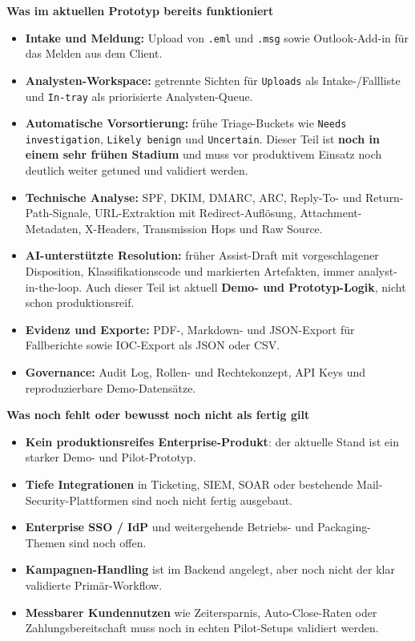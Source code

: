 \documentclass[10pt,a4paper]{article}
\begin{document}
\noindent\textbf{Was im aktuellen Prototyp bereits funktioniert}
\begin{itemize}
  \item \textbf{Intake und Meldung:} Upload von \texttt{.eml} und \texttt{.msg} sowie Outlook-Add-in für das Melden aus dem Client.
  \item \textbf{Analysten-Workspace:} getrennte Sichten für \texttt{Uploads} als Intake-/Fallliste und \texttt{In-tray} als priorisierte Analysten-Queue.
  \item \textbf{Automatische Vorsortierung:} frühe Triage-Buckets wie \texttt{Needs investigation}, \texttt{Likely benign} und \texttt{Uncertain}. Dieser Teil ist \textbf{noch in einem sehr frühen Stadium} und muss vor produktivem Einsatz noch deutlich weiter getuned und validiert werden.
  \item \textbf{Technische Analyse:} SPF, DKIM, DMARC, ARC, Reply-To- und Return-Path-Signale, URL-Extraktion mit Redirect-Auflösung, Attachment-Metadaten, X-Headers, Transmission Hops und Raw Source.
  \item \textbf{AI-unterstützte Resolution:} früher Assist-Draft mit vorgeschlagener Disposition, Klassifikationscode und markierten Artefakten, immer analyst-in-the-loop. Auch dieser Teil ist aktuell \textbf{Demo- und Prototyp-Logik}, nicht schon produktionsreif.
  \item \textbf{Evidenz und Exporte:} PDF-, Markdown- und JSON-Export für Fallberichte sowie IOC-Export als JSON oder CSV.
  \item \textbf{Governance:} Audit Log, Rollen- und Rechtekonzept, API Keys und reproduzierbare Demo-Datensätze.
\end{itemize}

\noindent\textbf{Was noch fehlt oder bewusst noch nicht als fertig gilt}
\begin{itemize}
  \item \textbf{Kein produktionsreifes Enterprise-Produkt}: der aktuelle Stand ist ein starker Demo- und Pilot-Prototyp.
  \item \textbf{Tiefe Integrationen} in Ticketing, SIEM, SOAR oder bestehende Mail-Security-Plattformen sind noch nicht fertig ausgebaut.
  \item \textbf{Enterprise SSO / IdP} und weitergehende Betriebs- und Packaging-Themen sind noch offen.
  \item \textbf{Kampagnen-Handling} ist im Backend angelegt, aber noch nicht der klar validierte Primär-Workflow.
  \item \textbf{Messbarer Kundennutzen} wie Zeitersparnis, Auto-Close-Raten oder Zahlungsbereitschaft muss noch in echten Pilot-Setups validiert werden.
\end{itemize}
\end{document}
